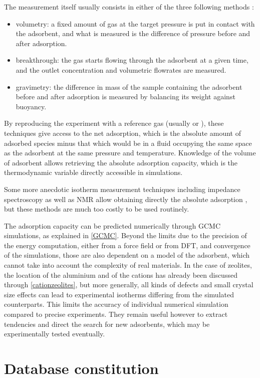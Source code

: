 \documentclass[main.tex]{subfiles}
\begin{document}
The measurement itself usually consists in either of the three following methods \autocite{BrandaniIsotherms2016}:
\begin{itemize}
	\item volumetry: a fixed amount of gas at the target pressure is put in contact with the adsorbent, and what is measured is the difference of pressure before and after adsorption.
	\item breakthrough: the gas starts flowing through the adsorbent at a given time, and the outlet concentration and volumetric flowrates are measured.
	\item gravimetry: the difference in mass of the sample containing the adsorbent before and after adsorption is measured by balancing its weight against buoyancy.
\end{itemize}
By reproducing the experiment with a reference gas (usually  or ), these techniques give access to the net adsorption, which is the absolute amount of adsorbed species minus that which would be in a fluid occupying the same space as the adsorbent at the same pressure and temperature. Knowledge of the volume of adsorbent allows retrieving the absolute adsorption capacity, which is the thermodynamic variable directly accessible in simulations.

Some more anecdotic isotherm measurement techniques including impedance spectroscopy as well as NMR allow obtaining directly the absolute adsorption \autocite{BrandaniIsotherms2016}, but these methods are much too costly to be used routinely.

The adsorption capacity can be predicted numerically through GCMC simulations, as explained in \cref{GCMC}. Beyond the limits due to the precision of the energy computation, either from a force field or from DFT, and convergence of the simulations, those are also dependent on a model of the adsorbent, which cannot take into account the complexity of real materials. In the case of zeolites, the location of the aluminium and of the cations has already been discussed through \cref{cationzeolites}, but more generally, all kinds of defects and small crystal size effects can lead to experimental isotherms differing from the simulated counterparts. This limits the accuracy of individual numerical simulation compared to precise experiments. They remain useful however to extract tendencies and direct the search for new adsorbents, which may be experimentally tested eventually.

\section{Database constitution}
\end{document}
